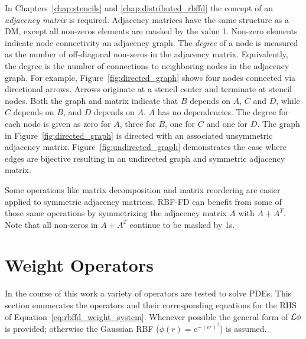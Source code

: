 \documentclass[11pt]{report}
\begin{document}
{In Chapters~\ref{chap:stencils} and \ref{chap:distributed_rbffd} the concept of an \emph{adjacency matrix} is required. Adjacency matrices have the same structure as a DM, except all non-zeros elements are masked by the value 1. Non-zero elements indicate node connectivity an adjacency graph. The \emph{degree} of a node is measured as the number of off-diagonal non-zeros in the adjacency matrix. Equivalently, the degree is the number of connections to neighboring nodes in the adjacency graph. For example, Figure~\ref{fig:directed_graph} shows four nodes connected via directional arrows. Arrows originate at a stencil center and terminate at stencil nodes. Both the graph and matrix indicate that $B$ depends on $A$, $C$ and $D$, while $C$ depends on $B$, and $D$ depends on $A$. $A$ has no dependencies. The degree for each node is given as zero for $A$, three for $B$, one for $C$ and one for $D$. The graph in Figure~\ref{fig:directed_graph} is directed with an associated unsymmetric adjacency matrix. Figure~\ref{fig:undirected_graph} demonstrates the case where edges are bijective resulting in an undirected graph and symmetric adjacency matrix. 

Some operations like matrix decomposition and matrix reordering are easier applied to symmetric adjacency matrices. RBF-FD can benefit from some of those same operations by symmetrizing the adjacency matrix $A$ with $A+A^T$. Note that all non-zeros in $A+A^T$ continue to be masked by 1s.




\section{Weight Operators}
\label{sec:weight_operators}
In the course of this work a variety of operators are tested to solve PDEs. This section enumerates the operators and their corresponding equations for the RHS of Equation~\ref{eq:rbffd_weight_system}. Whenever possible the general form of $\mathcal{L}\phi$ is provided; otherwise the Gaussian RBF ($\phi(r) = e^{-(\epsilon r)^2}$) is assumed. 


}
\end{document}
